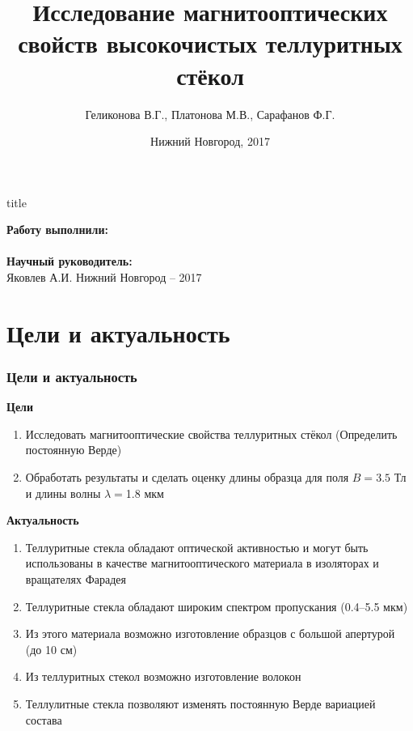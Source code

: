 \documentclass[10pt,pdf,hyperref={unicode}, dvipsnames]{beamer}
\title[Магнитооптическая активность теллуритных стёкол]{Исследование магнитооптических свойств высокочистых теллуритных стёкол}
\author{%
	Геликонова В.Г., %
	Платонова М.В., %
	Сарафанов Ф.Г. %
}
\institute{Радиофизический факультет ННГУ, 420 группа}
\date{Нижний Новгород, 2017}
\begin{document}
  

\begin{frame}[plain]
	\centering
	\vspace{2cm}
	\begin{beamercolorbox}[sep=8pt,center]{title}
		\bf{}\inserttitle
	\end{beamercolorbox}
	\vspace{0.5cm}
	\normalsize \textbf{Работу выполнили:}\\
	\large\insertauthor\\ 
	\vspace{0.5cm}
	\normalsize{\textbf{Научный руководитель:}\\}
	\large{Яковлев А.И.}
	\vfill
	\small{Нижний Новгород -- 2017}
\end{frame}
\section{Цели и актуальность}
\begin{frame}[t]
	\frametitle{Цели и актуальность}
	\textbf{Цели}\\
	\begin{enumerate}
		\item Исследовать магнитооптические свойства теллуритных стёкол (Определить постоянную Верде)
		\item Обработать результаты и сделать оценку длины образца
		      для поля $B=3.5$ Тл и длины волны $\lambda=$1.8 мкм
	\end{enumerate}
	\textbf{Актуальность}\\
	\begin{enumerate}
		\item Теллуритные стекла обладают оптической активностью и могут быть использованы в качестве магнитооптического материала в изоляторах и вращателях Фарадея
		\item Теллуритные стекла обладают широким спектром пропускания (0.4--5.5  мкм) %
		\item Из этого материала возможно изготовление образцов с большой апертурой (до 10 см)
		\item Из теллуритных стекол возможно изготовление волокон
		\item Теллулитные стекла позволяют изменять постоянную Верде вариацией состава
	\end{enumerate}
\end{frame}
\end{document}
